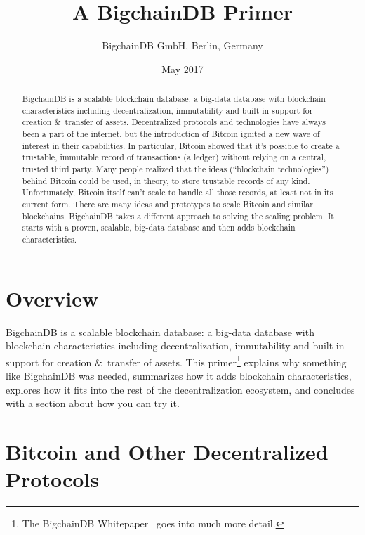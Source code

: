 \documentclass[a4paper]{article}
\title{A BigchainDB Primer}
\author{BigchainDB GmbH, Berlin, Germany}
\date{May 2017}
\begin{document}
\maketitle

\begin{abstract}
BigchainDB is a scalable blockchain database:
a big-data database with blockchain characteristics
including decentralization, immutability and
built-in support for creation \&~transfer of assets.
Decentralized protocols and technologies have always been a part of the internet,
but the introduction of Bitcoin ignited a new wave of interest in their capabilities.
In particular, Bitcoin showed that it's possible to create a trustable, immutable
record of transactions (a ledger) without relying on a central, trusted third party.
Many people realized that the ideas (``blockchain technologies'') behind Bitcoin
could be used, in theory, to store trustable records of any kind.
Unfortunately, Bitcoin itself can't scale to handle all those records,
at least not in its current form.
There are many ideas and prototypes to scale Bitcoin and similar blockchains.
BigchainDB takes a different approach to solving the scaling problem.
It starts with a proven, scalable, big-data database and
then adds blockchain characteristics.
\end{abstract}


\section{Overview}

BigchainDB is a scalable blockchain database:
a big-data database with blockchain characteristics
including decentralization, immutability and
built-in support for creation \&~transfer of assets.
This primer\footnote{The
BigchainDB Whitepaper~\cite{bigchaindb_whitepaper}
goes into much more detail.}
explains why something like BigchainDB was needed,
summarizes how it adds blockchain characteristics,
explores how it fits into the rest of the decentralization ecosystem,
and concludes with a section about how you can try it.


\section{Bitcoin and Other Decentralized Protocols}
\end{document}
